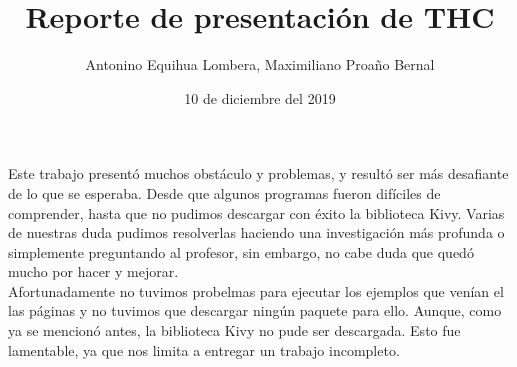 \documentclass[]{article}
\title{Reporte de presentación de THC}
\author{Antonino Equihua Lombera, Maximiliano Proaño Bernal}
\date{10 de diciembre del 2019}
\begin{document}
	\maketitle
Este trabajo presentó muchos obstáculo y problemas, y resultó ser más desafiante de lo que se esperaba. Desde que algunos programas fueron difíciles de comprender, hasta que no pudimos descargar con éxito la biblioteca Kivy. Varias de nuestras duda pudimos resolverlas haciendo una investigación más profunda o simplemente preguntando al profesor, sin embargo, no cabe duda que quedó mucho por hacer y mejorar.\\

Afortunadamente no tuvimos probelmas para ejecutar los ejemplos que venían el las páginas y no tuvimos que descargar ningún paquete para ello. Aunque, como ya se mencionó antes, la biblioteca Kivy no pude ser descargada.
Esto fue lamentable, ya que nos limita a entregar un trabajo incompleto.
\maketitle


\section{}
\end{document}
